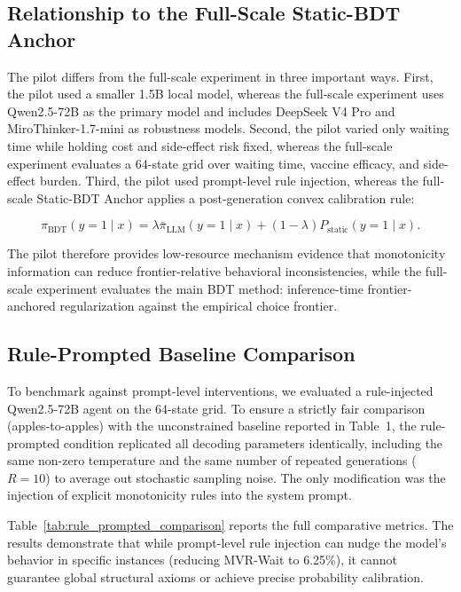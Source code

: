 \documentclass[11pt]{article}
\begin{document}
\subsection{Relationship to the Full-Scale Static-BDT Anchor}

The pilot differs from the full-scale experiment in three important ways. First, the pilot used a smaller 1.5B local model, whereas the full-scale experiment uses Qwen2.5-72B as the primary model and includes DeepSeek V4 Pro and MiroThinker-1.7-mini as robustness models. Second, the pilot varied only waiting time while holding cost and side-effect risk fixed, whereas the full-scale experiment evaluates a 64-state grid over waiting time, vaccine efficacy, and side-effect burden. Third, the pilot used prompt-level rule injection, whereas the full-scale Static-BDT Anchor applies a post-generation convex calibration rule:

\[
\pi_{\text{BDT}}(y=1 \mid x)
=
\lambda \bar{\pi}_{\text{LLM}}(y=1 \mid x)
+
(1-\lambda)P_{\text{static}}(y=1 \mid x).
\]

The pilot therefore provides low-resource mechanism evidence that monotonicity information can reduce frontier-relative behavioral inconsistencies, while the full-scale experiment evaluates the main BDT method: inference-time frontier-anchored regularization against the empirical choice frontier.


\subsection{Rule-Prompted Baseline Comparison}
\label{app:rule_prompted_baseline}

To benchmark against prompt-level interventions, we evaluated a rule-injected Qwen2.5-72B agent on the 64-state grid. To ensure a strictly fair comparison (apples-to-apples) with the unconstrained baseline reported in Table~1, the rule-prompted condition replicated all decoding parameters identically, including the same non-zero temperature and the same number of repeated generations ($R=10$) to average out stochastic sampling noise. The only modification was the injection of explicit monotonicity rules into the system prompt.

Table~\ref{tab:rule_prompted_comparison} reports the full comparative metrics. The results demonstrate that while prompt-level rule injection can nudge the model's behavior in specific instances (reducing MVR-Wait to 6.25\%), it cannot guarantee global structural axioms or achieve precise probability calibration.
\end{document}
